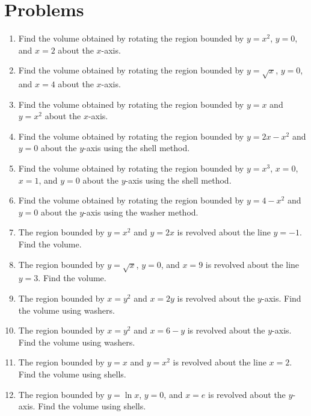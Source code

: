 \documentclass[12pt]{article}
\begin{document}
\section*{Problems}
\begin{enumerate}[leftmargin=*, itemsep=1em, topsep=0.8em]
  \item Find the volume obtained by rotating the region bounded by $y=x^2$, $y=0$, and $x=2$ about the $x$-axis.

  \item Find the volume obtained by rotating the region bounded by $y=\sqrt{x}$, $y=0$, and $x=4$ about the $x$-axis.

  \item Find the volume obtained by rotating the region bounded by $y=x$ and $y=x^2$ about the $x$-axis.

  \item Find the volume obtained by rotating the region bounded by $y=2x-x^2$ and $y=0$ about the $y$-axis using the shell method.

  \item Find the volume obtained by rotating the region bounded by $y=x^3$, $x=0$, $x=1$, and $y=0$ about the $y$-axis using the shell method.

  \item Find the volume obtained by rotating the region bounded by $y=4-x^2$ and $y=0$ about the $y$-axis using the washer method.

  \item The region bounded by $y=x^2$ and $y=2x$ is revolved about the line $y=-1$. Find the volume.

  \item The region bounded by $y=\sqrt{x}$, $y=0$, and $x=9$ is revolved about the line $y=3$. Find the volume.

  \item The region bounded by $x=y^2$ and $x=2y$ is revolved about the $y$-axis. Find the volume using washers.

  \item The region bounded by $x=y^2$ and $x=6-y$ is revolved about the $y$-axis. Find the volume using washers.

  \item The region bounded by $y=x$ and $y=x^2$ is revolved about the line $x=2$. Find the volume using shells.

  \item The region bounded by $y=\ln x$, $y=0$, and $x=e$ is revolved about the $y$-axis. Find the volume using shells.
\end{enumerate}
\end{document}
